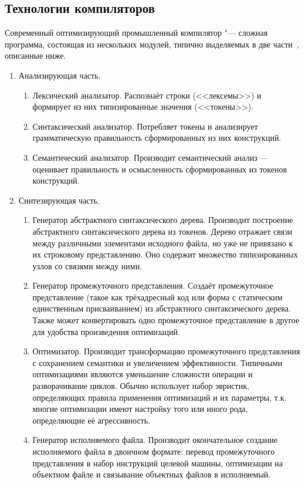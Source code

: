 \subsection{Технологии компиляторов}
Современный оптимизирующий промышленный компилятор "--- сложная программа, состоящая из нескольких модулей, типично выделяемых в две части~\cite{Aho:2006:CPT:1177220}, описанные ниже.
\begin{enumerate}
	\item Анализирующая часть.
	\begin{enumerate}
		\item Лексический анализатор. Распознаёт строки (<<лексемы>>) и формирует из них типизированные значения (<<токены>>).
		\item Синтаксический анализатор. Потребляет токены и анализирует грамматическую правильность сформированных из них конструкций.
		\item Семантический анализатор. Производит семантический анализ --- оценивает правильность и осмысленность сформированных из токенов конструкций.
	\end{enumerate}
	\item Синтезирующая часть.
	\begin{enumerate}
		\item Генератор абстрактного синтаксического дерева. Производит построение абстрактного синтаксического дерева из токенов. Дерево отражает связи между различными элементами исходного файла, но уже не привязано к их строковому представлению. Оно содержит множество типизированных узлов со связями между ними.
		\item Генератор промежуточного представления. Создаёт промежуточное представление (такое как трёхадресный код или форма с статическим единственным присваиванием) из абстрактного синтаксического дерева. Также может конвертировать одно промежуточное представление в другое для удобства произведения оптимизаций.
		\item Оптимизатор. Производит трансформацию промежуточного представления с сохранением семантики и увеличением эффективности. Типичными оптимизациями являются уменьшение сложности операции и разворачивание циклов. Обычно использует набор эвристик, определяющих правила применения оптимизаций и их параметры, т.к. многие оптимизации имеют настройку того или иного рода, определяющие её агрессивность.
		\item Генератор исполняемого файла. Производит окончательное создание исполняемого файла в двоичном формате: перевод промежуточного представления в набор инструкций целевой машины, оптимизации на объектном файле и связывание объектных файлов в исполняемый.
	\end{enumerate}
\end{enumerate}

